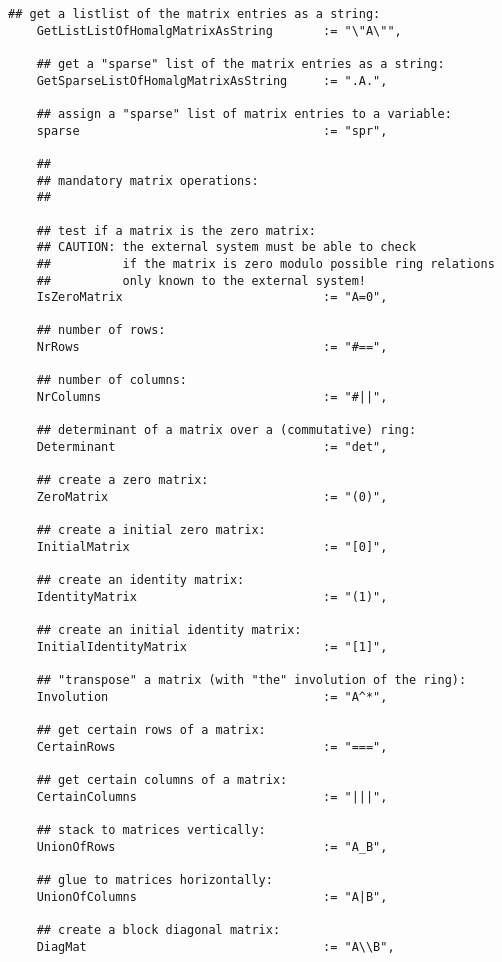 \documentclass[a4paper,11pt]{report}
\begin{document}
{{{\begin{Verbatim}[fontsize=\small,frame=single,label=Code]
    ## get a listlist of the matrix entries as a string:
    GetListListOfHomalgMatrixAsString       := "\"A\"",
    
    ## get a "sparse" list of the matrix entries as a string:
    GetSparseListOfHomalgMatrixAsString     := ".A.",
    
    ## assign a "sparse" list of matrix entries to a variable:
    sparse                                  := "spr",
    
    ##
    ## mandatory matrix operations:
    ##
    
    ## test if a matrix is the zero matrix:
    ## CAUTION: the external system must be able to check
    ##          if the matrix is zero modulo possible ring relations
    ##          only known to the external system!
    IsZeroMatrix                            := "A=0",
    
    ## number of rows:
    NrRows                                  := "#==",
    
    ## number of columns:
    NrColumns                               := "#||",
    
    ## determinant of a matrix over a (commutative) ring:
    Determinant                             := "det",
    
    ## create a zero matrix:
    ZeroMatrix                              := "(0)",
    
    ## create a initial zero matrix:
    InitialMatrix                           := "[0]",
    
    ## create an identity matrix:
    IdentityMatrix                          := "(1)",
    
    ## create an initial identity matrix:
    InitialIdentityMatrix                   := "[1]",
    
    ## "transpose" a matrix (with "the" involution of the ring):
    Involution                              := "A^*",
    
    ## get certain rows of a matrix:
    CertainRows                             := "===",
    
    ## get certain columns of a matrix:
    CertainColumns                          := "|||",
    
    ## stack to matrices vertically:
    UnionOfRows                             := "A_B",
    
    ## glue to matrices horizontally:
    UnionOfColumns                          := "A|B",
    
    ## create a block diagonal matrix:
    DiagMat                                 := "A\\B",
    

\end{Verbatim}}}}
\end{document}
